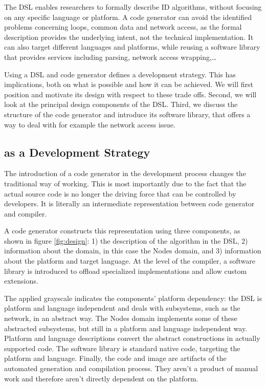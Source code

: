 \documentclass[conference]{IEEEtran}
\begin{document}

The DSL enables researchers to formally describe ID algorithms, without
focusing on any specific language or platform. A code generator can avoid the
identified problems concerning loops, common data and network access, as the
formal description provides the underlying intent, not the technical
implementation. It can also target different languages and platforms, while
reusing a software library that provides services including parsing, network
access wrapping,\dots

Using a DSL and code generator defines a development strategy. This has
implications, both on what is possible and how it can be achieved. We will
first position \NAME and motivate its design with respect to these trade offs.
Second, we will look at the principal design components of the DSL. Third, we
discuss the structure of the code generator and introduce its software library,
that offers a way to deal with for example the network access issue.

\subsection{\NAME as a Development Strategy}
\label{positioning}

The introduction of a code generator in the development process changes the
traditional way of working. This is most importantly due to the fact that the
actual source code is no longer the driving force that can be controlled by
developers. It is literally an intermediate representation between code
generator and compiler.

A code generator constructs this representation using three components, as
shown in figure \ref{fig:design}: 1) the description of the algorithm in the
DSL, 2) information about the domain, in this case the Nodes domain, and 3)
information about the platform and target language. At the level of the
compiler, a software library is introduced to offload specialized
implementations and allow custom extensions.

The applied grayscale indicates the components' platform dependency: the DSL is
platform and language independent and deals with subsystems, such as the
network, in an abstract way. The Nodes domain implements some of these
abstracted subsystems, but still in a platform and language independent way.
Platform and language descriptions convert the abstract constructions in
actually supported code. The software library is standard native code,
targeting the platform and language. Finally, the code and image are artifacts
of the automated generation and compilation process. They aren't a product of
manual work and therefore aren't directly dependent on the platform.
\end{document}
